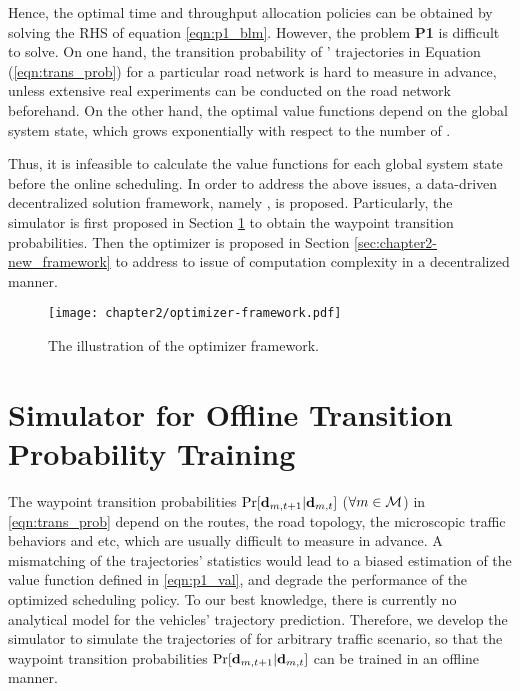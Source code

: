 Hence, the optimal time and throughput allocation policies can be obtained by solving the RHS of equation \eqref{eqn:p1_blm}.
However, the problem {\bf P1} is difficult to solve.
On one hand, the transition probability of {\IAVs}' trajectories in Equation (\ref{eqn:trans_prob}) for a particular road network is hard to measure in advance, unless extensive real experiments can be conducted on the road network beforehand.
On the other hand, the optimal value functions depend on the global system state, which grows exponentially with respect to the number of {\IAVs}.

Thus, it is infeasible to calculate the value functions for each global system state before the online scheduling.
In order to address the above issues, a data-driven decentralized solution framework, namely {\fwName}, is proposed.
Particularly, the {\fwName} simulator is first proposed in Section \ref{sec:chapter2-framework} to obtain the waypoint transition probabilities.
Then the {\fwName} optimizer is proposed in Section \ref{sec:chapter2-new_framework} to address to issue of computation complexity in a decentralized manner.

\begin{figure*}[htp!]
    \centering
    \texttt{[image: chapter2/optimizer-framework.pdf]}
    \caption{The illustration of the {\fwName} optimizer framework.}
    \label{fig:optimizer_framework}
\end{figure*}

\section{{\fwName} Simulator for Offline Transition Probability Training}
\label{sec:chapter2-framework}

The waypoint transition probabilities $\Pr[\mathbf{d}_{m,t+1}|\mathbf{d}_{m,t}]$ ($\forall m\in\mathcal{M}$) in \eqref{eqn:trans_prob} depend on the routes, the road topology, the microscopic traffic behaviors and etc, which are usually difficult to measure in advance.
A mismatching of the trajectories' statistics would lead to a biased estimation of the value function defined in \eqref{eqn:p1_val}, and degrade the performance of the optimized scheduling policy. To our best knowledge, there is currently no analytical model for the vehicles' trajectory prediction.
Therefore, we develop the {\fwName} simulator to simulate the trajectories of {\IAVs} for arbitrary traffic scenario, so that the waypoint transition probabilities $\Pr[\mathbf{d}_{m,t+1}|\mathbf{d}_{m,t}]$ can be trained in an offline manner.

